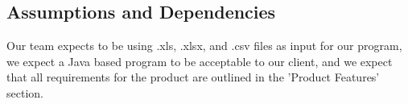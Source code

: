 \subsection{Assumptions and Dependencies}
Our team expects to be using .xls, .xlsx, and .csv files as input for our program, we expect a Java based program to be acceptable to our client, and we expect that all requirements for the product are outlined in the 'Product Features' section.

